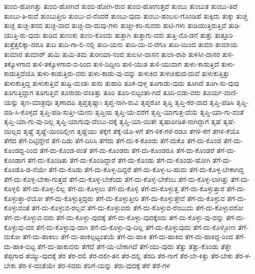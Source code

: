 {ತುಂಬಿ-ಹೋಗಿತ್ತು
ತುಂಬಿ-ಹೋಗಿದೆ
ತುಂಬಿ-ಹೋಗಿ-ರುವ
ತುಂಬಿ-ಹೋಗುತ್ತದೆ
ತುಂಬು
ತುಂಬುತ
ತುಂಬು-ತಿದೆ
ತುಂಬು-ತಿ-ರುವೆ
ತುಂಬುತ್ತೀರಿ
ತುಂಬು-ವ-ನೆಂದರೆ
ತುಂಬು-ವುದು
ತುಂಬು-ಹಂಬಲ-ಗೊಂಡಿಹೆ
ತುಕ್ಕಿದು
ತುಕ್ಕು
ತುಚ್ಚ
ತುಚ್ಛ
ತುಚ್ಛ-ತನದ
ತುಚ್ಛ-ವಾದ
ತುಚ್ಛ-ವಾ-ದುವು-ಗಳು
ತುಚ್ಛೀ-ಕರಿ-ಸುವರು
ತುಟಿ-ಗಳು
ತುಡಿಯುತ್ತಿರುತ್ತಿವೆ
ತುಡಿ-ಯುತ್ತಿ-ರು-ವುದು
ತುಡಿವ
ತುಣುಕು
ತುಣು-ಕೊಂದು
ತುತ್ತಾಗಿ
ತುತ್ತಾಗು-ವರು
ತುತ್ತಿ-ನೊ-ಡನೆ
ತುತ್ತು
ತುತ್ತೂರಿ
ತುತ್ತೆತ್ತಲಿಕ್ಕಾ-ದರೂ
ತುದಿ
ತುದಿ-ಗಾ-ಲಿ-ನಲ್ಲಿ
ತುದಿ-ಯನು
ತುದಿ-ಯ-ವ-ರೆಗೂ
ತುದಿ-ಯಿಂದ
ತುಮಾ
ತುಮಾಯ
ತುಮಾರ
ತುಮಾರ್
ತುಮಿ
ತುಮಿ-ತಮ
ತುರೀಯಾ-ನಂದ
ತುಲಸೀ-ದಾಸನ
ತುಲಾ-ರಾಶಿ
ತುಳಸೀ-ದಾಸರ
ತುಳಿ-ತಕ್ಕೊಳಗಾದ
ತುಳಿ-ತಕ್ಕೊಳಗಾದ-ವ-ರಿಂದ
ತುಳಿ-ದಿದ್ದೀರಿ
ತುಳಿ-ಯುತ
ತುಳಿ-ಯುವಾಗ
ತುಳು-ಕಾಡುತ್ತಿದೆ
ತುಳು-ಕಾಡುತ್ತಿದೆಯೊ
ತುಳು-ಕಾಡುತ್ತಿರು-ವರು
ತುಳು-ಕಾಡು-ವು-ದನ್ನು
ತುಳುಕಿದ
ತುಳುಕಿಹುದ-ದುವೆ
ತುಳುಕುತ್ತಿತ್ತು
ತುಳುಕುತ್ತಿದ್ದ
ತುಳುಕುತ್ತಿವೆ
ತುಷ್ಟಿ-ಮಂತಃ
ತುಸು
ತುಹಾರಿ
ತೂಕ-ವುಳ್ಳ
ತೂಗಾಡು-ವುದು
ತೂಗಿದೆ
ತೂಗಿ-ಸು-ವುವು
ತೂಗುತ್ತಿದ್ದಾಗ
ತೂಗುತ್ತಿವೆ
ತೂರಾಡು-ವಂತಿತ್ತು
ತೂರಿ
ತೂರಿ-ಬಿಟ್ಟಂತಾ-ಗಿದೆ
ತೂರಿ-ಬಿಡು-ವರು
ತೂರ್ಯ-ವಾಣಿ-ಯನ್ನು
ತೃಣ-ಮಾತ್ರವೂ
ತೃಣಾದಪಿ
ತೃಪ್ತತೃಷ್ಣಾಃ
ತೃಪ್ತ-ನಾಗಿ-ರುವಿ
ತೃಪ್ತರೋ
ತೃಪ್ತಿ
ತೃಪ್ತಿ-ಕರ-ವಾದ
ತೃಪ್ತಿ-ಪಡಿಸಿ
ತೃಪ್ತಿ-ಪಡಿ-ಸಿ-ಕೊಳ್ಳದೆ
ತೃಪ್ತಿ-ಪಡಿ-ಸುತ್ತೀ-ಯೇನು
ತೃಪ್ತಿಯ
ತೃಪ್ತಿ-ಯ-ವರೆಗೆ
ತೃಪ್ತಿ-ಯಾಗುತ್ತ-ದೆಯೆ
ತೃಪ್ತಿ-ಯಾ-ಗು-ವಂತೆ
ತೃಪ್ತಿ-ಯಾ-ಗು-ವು-ದಿಲ್ಲ
ತೃಪ್ತಿ-ಯಾಗುವು-ದೆಂಬು-ದಕ್ಕೆ
ತೃಪ್ತಿ-ಯಾ-ಯಿತೇ
ತೃಷಾಪೀಡಿತ-ನಾಗಿದ್ದಾಗ
ತೃಷೆ
ತೃಷೆ-ಯಿಲ್ಲದ
ತೃಷ್ಣೆ
ತೃಷ್ಣೆ-ಯಿಂದಿಲ್ಲೀಗ
ತೃಷ್ಣೆಯು
ತೆಕ್ಕೆಗೆ
ತೆಕ್ಕೆ-ಯೊ-ಳಗೆ
ತೆಗ-ಳಿಕೆ-ಗಳೆ-ರಡೂ
ತೆಗಳಿ-ಕೆಗೆ
ತೆಗಳಿ-ಕೆಯೊ
ತೆಗೆದ
ತೆಗೆ-ದಿಟ್ಟಿದ್ದೇನೆ
ತೆಗೆ-ದಿಡು
ತೆಗೆ-ದಿರಿಸಿ
ತೆಗೆದು
ತೆಗೆ-ದು-ಕ-ಕೊಂಡು
ತೆಗೆ-ದುಕೊ
ತೆಗೆ-ದು-ಕೊಂಡ
ತೆಗೆ-ದು-ಕೊಂಡದ್ದ-ರಿಂದ
ತೆಗೆ-ದು-ಕೊಂಡ-ರಂತೆ
ತೆಗೆ-ದು-ಕೊಂಡರು
ತೆಗೆ-ದು-ಕೊಂಡರೂ
ತೆಗೆ-ದು-ಕೊಂಡರೆ
ತೆಗೆ-ದು-ಕೊಂಡಾಗ
ತೆಗೆ-ದು-ಕೊಂಡಿತು
ತೆಗೆ-ದು-ಕೊಂಡಿದ್ದಾರೆ
ತೆಗೆ-ದು-ಕೊಂಡು
ತೆಗೆ-ದು-ಕೊಂಡು-ಹೋಗಿ
ತೆಗೆ-ದು-ಕೊಂಡೊ-ಡ-ನೆಯೇ
ತೆಗೆ-ದು-ಕೊಡು
ತೆಗೆ-ದು-ಕೊಳ್ಳ-ದಿದ್ದರೆ
ತೆಗೆ-ದು-ಕೊಳ್ಳ-ಬ-ಹುದು
ತೆಗೆ-ದು-ಕೊಳ್ಳ-ಬೇಕಾಗಿದ್ದ
ತೆಗೆ-ದು-ಕೊಳ್ಳ-ಬೇಕಾ-ಗುತ್ತದೆ
ತೆಗೆ-ದು-ಕೊಳ್ಳ-ಬೇಕೆಂದು
ತೆಗೆ-ದು-ಕೊಳ್ಳ-ಬೇಕೆಂಬ
ತೆಗೆ-ದು-ಕೊಳ್ಳ-ಲಾಗಿತ್ತು
ತೆಗೆ-ದು-ಕೊಳ್ಳಲಿ
ತೆಗೆ-ದು-ಕೊಳ್ಳ-ಲಿಲ್ಲ
ತೆಗೆ-ದು-ಕೊಳ್ಳಲು
ತೆಗೆ-ದು-ಕೊಳ್ಳಿ
ತೆಗೆ-ದು-ಕೊಳ್ಳುತ್ತ
ತೆಗೆ-ದು-ಕೊಳ್ಳುತ್ತಾರೆ
ತೆಗೆ-ದು-ಕೊಳ್ಳುತ್ತಾ-ರೆಯೋ
ತೆಗೆ-ದು-ಕೊಳ್ಳುತ್ತಿದ್ದರು
ತೆಗೆ-ದು-ಕೊಳ್ಳುತ್ತೀರಿ
ತೆಗೆ-ದು-ಕೊಳ್ಳುತ್ತೇವೆ
ತೆಗೆ-ದು-ಕೊಳ್ಳುವ
ತೆಗೆ-ದು-ಕೊಳ್ಳುವಂತೆ
ತೆಗೆ-ದು-ಕೊಳ್ಳುವ-ರಲ್ಲವೆ
ತೆಗೆ-ದು-ಕೊಳ್ಳುವರು
ತೆಗೆ-ದು-ಕೊಳ್ಳುವ-ರೆಂಬುದು
ತೆಗೆ-ದು-ಕೊಳ್ಳುವರೋ
ತೆಗೆ-ದು-ಕೊಳ್ಳುವ-ವರು
ತೆಗೆ-ದು-ಕೊಳ್ಳು-ವುದಕ್ಕೆ
ತೆಗೆ-ದು-ಕೊಳ್ಳು-ವುದಕ್ಕೆಂದು
ತೆಗೆ-ದು-ಕೊಳ್ಳು-ವು-ದನ್ನು
ತೆಗೆ-ದು-ಕೊಳ್ಳುವು-ದರ
ತೆಗೆ-ದು-ಕೊಳ್ಳುವು-ದಾಗಿ
ತೆಗೆ-ದು-ಕೊಳ್ಳು-ವು-ದಿಲ್ಲ
ತೆಗೆ-ದು-ಕೊಳ್ಳುವುದು
ತೆಗೆ-ದು-ಕೊಳ್ಳೋಣ
ತೆಗೆ-ದುಕೋ
ತೆಗೆ-ದು-ಹಾಕಲು
ತೆಗೆ-ದು-ಹಾಕಲ್ಪಟ್ಟಂತೆಯೆ
ತೆಗೆ-ದು-ಹಾಕಿ
ತೆಗೆ-ದು-ಹಾಕಿದ
ತೆಗೆ-ದು-ಹಾಕಿದ್ದ-ರಿಂದ
ತೆಗೆ-ದು-ಹಾಕಿ-ಬಿಟ್ಟ
ತೆಗೆ-ದು-ಹಾಕುವನು
ತೆಗೆದೆ
ತೆಗೆ-ಯ-ಬೇಕಾಗಿದೆ
ತೆಗೆ-ಯು-ವುದು
ತೆತ್ತು
ತೆತ್ತು-ಕೊಂಡು
ತೆತ್ತೇ
ತೆಪ್ಪಗಾದ
ತೆಯ್ಯು-ವುದಕ್ಕೆ
ತೆರ
ತೆರ-ದಲಿ
ತೆರ-ದಲೀ-ತನ
ತೆರ-ದಲ್ಲಿ
ತೆರದಿ
ತೆರ-ನಾಗೆ
ತೆರ-ಬೇ-ಕಿತ್ತು
ತೆರ-ಬೇಕು
ತೆರ-ಳ-ಬೇಕು
ತೆರ-ಳಿ-ದಂತೆಯೇ
ತೆರ-ಳಿದರು
ತೆರಿಗೆ-ಯನ್ನು
ತೆರು-ವುದಕ್ಕೆ
ತೆರೆ
ತೆರೆ-ಗಳ
}

